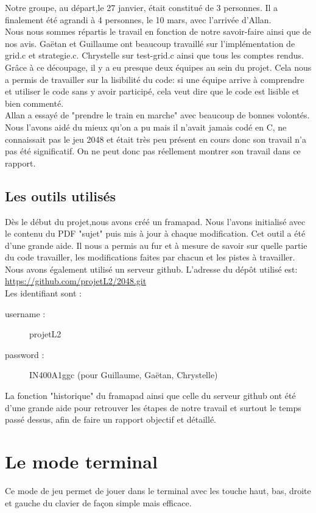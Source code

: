 \documentclass{report}
\begin{document}
Notre groupe, au départ,le 27 janvier, était constitué de 3 personnes. Il a finalement été agrandi à 4 personnes, le 10 mars, avec l'arrivée d'Allan.\\ Nous nous sommes répartis le travail en fonction de notre savoir-faire ainsi que de nos avis. Gaëtan et Guillaume ont beaucoup travaillé sur l'implémentation de grid.c et strategie.c. Chrystelle sur test-grid.c ainsi que tous les comptes rendus. Grâce à ce découpage, il y a eu presque deux équipes au sein du projet. Cela nous a permis de travailler sur la lisibilité du code: si une équipe arrive à comprendre et utiliser le code sans y avoir participé, cela veut dire que le code est lisible et bien commenté.\\ Allan a essayé de "prendre le train en marche" avec beaucoup de bonnes volontés. Nous l'avons aidé du mieux qu'on a pu mais il n'avait jamais codé en C, ne connaissait pas le jeu 2048 et était très peu présent en cours donc son travail n'a pas été significatif. On ne peut donc pas réellement montrer son travail dans ce rapport.
\section{Les outils utilisés}
Dès le début du projet,nous avons créé un framapad. Nous l'avons initialisé avec le contenu du PDF "sujet" puis mis à jour à chaque modification. Cet outil a été d'une grande aide. Il nous a permis au fur et à mesure de savoir sur quelle partie du code travailler, les modifications faites par chacun et les pistes à travailler. \\
Nous avons également utilisé un serveur github. L'adresse du dépôt utilisé est: \url{https://github.com/projetL2/2048.git} \\Les identifiant sont :
\begin{description}
\item [username : ] projetL2
\item [password : ] IN400A1ggc  (pour Guillaume, Gaëtan, Chrystelle)
\end{description}
La fonction "historique" du framapad ainsi que celle du serveur github ont été d'une grande aide pour retrouver les étapes de notre travail et surtout le temps passé dessus, afin de faire un rapport objectif et détaillé.

\chapter{Le mode terminal}
Ce mode de jeu permet de jouer dans le terminal avec les touche haut, bas, droite et gauche du clavier de façon simple mais efficace.
\end{document}
